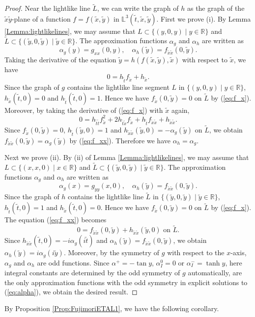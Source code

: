 \documentclass[12pt,amstex]{amsart}%
\theoremstyle{plain} %
\theoremstyle{definition}
\begin{document}
\begin{proof}
Near the lightlike line $\tilde{L}$, we can write the graph of $h$ as the graph of the $\tilde{x}\tilde{y}$-plane of a function $f=f(\tilde{x},\tilde{y})$ in $\mathbb{L}^3(\tilde{t},\tilde{x},\tilde{y})$. First we prove (i). By Lemma \ref{Lemma:lightlikelines}, we may assume that $L\subset \{(y,0,y)\mid y\in \mathbb{R}\}$ and  $\tilde{L} \subset \{(\tilde{y},0,\tilde{y})\mid \tilde{y}\in \mathbb{R}\}$. The approximation functions $\alpha_g$ and $\alpha_h$ are written as
\[
\alpha_g(y)=g_{xx}(0,y),\quad \alpha_h(\tilde{y})=f_{\tilde{x}\tilde{x}}(0,\tilde{y}).
\]
Taking the derivative of the equation $\tilde{y}=h(f(\tilde{x},\tilde{y}),\tilde{x})$ with respect to $\tilde{x}$, we have
\begin{equation}\label{eq:f_x}
0=h_{\tilde{t}}f_{\tilde{x}}+h_{\tilde{x}}.
\end{equation}
Since the graph of $g$ contains the lightlike line segment $L$ in $\{(y,0,y)\mid y\in \mathbb{R}\}$, $h_{\tilde{x}}(\tilde{t},0)=0$ and $h_{\tilde{t}}(\tilde{t},0)=1$. Hence we have $f_{\tilde{x}}(0,\tilde{y})=0$ on $\tilde{L}$ by (\ref{eq:f_x}). Moreover, by taking the derivative of (\ref{eq:f_x}) with $\tilde{x}$ again,
\begin{equation}\label{eq:f_xx}
0=h_{\tilde{t}\tilde{t}}f_{\tilde{x}}^2+2h_{\tilde{t}\tilde{x}}f_{\tilde{x}}+h_{\tilde{t}}f_{\tilde{x}\tilde{x}}+h_{\tilde{x}\tilde{x}}.
\end{equation}
Since $f_{\tilde{x}}(0,\tilde{y})=0$, $h_{\tilde{t}}(\tilde{y},0)=1$ and $h_{\tilde{x}\tilde{x}}(\tilde{y},0)=-\alpha_g(\tilde{y})$ on $\tilde{L}$, we obtain $f_{\tilde{x}\tilde{x}}(0,\tilde{y})=\alpha_g(\tilde{y})$ by (\ref{eq:f_xx}). Therefore we have $\alpha_h=\alpha_g$. 

Next we prove (ii). By (ii) of Lemma \ref{Lemma:lightlikelines}, we may assume that $L\subset \{(x,x,0)\mid x\in \mathbb{R}\}$ and  $\tilde{L} \subset \{(\tilde{y},0,\tilde{y})\mid \tilde{y}\in \mathbb{R}\}$. The approximation functions $\alpha_g$ and $\alpha_h$ are written as
\[
\alpha_g(x)=g_{yy}(x,0),\quad \alpha_h(\tilde{y})=f_{\tilde{x}\tilde{x}}(0,\tilde{y}).
\]
Since the graph of $h$ contains the lightlike line $\tilde{L}$ in $\{(\tilde{y},0,\tilde{y})\mid \tilde{y}\in \mathbb{R}\}$, $h_{\tilde{t}}(\tilde{t},0)=1$ and $h_{\tilde{x}}(\tilde{t},0)=0$. Hence we have $f_{\tilde{x}}(0,\tilde{y})=0$ on $\tilde{L}$ by (\ref{eq:f_x}). The equation (\ref{eq:f_xx}) becomes
\[
0=f_{\tilde{x}\tilde{x}}(0,\tilde{y})+h_{\tilde{x}\tilde{x}}(\tilde{y},0) \text{ on $\tilde{L}$.}
\]
Since $h_{\tilde{x}\tilde{x}}(\tilde{t},0)=-i\alpha_g(i\tilde{t})$ and $\alpha_h(\tilde{y})=f_{\tilde{x}\tilde{x}}(0,\tilde{y})$, we obtain $\alpha_h(\tilde{y})=i\alpha_g(i\tilde{y})$. Moreover, by the symmetry of $g$ with respect to the $x$-axis, $\alpha_g$ and $\alpha_h$ are odd functions. Since $\alpha^+=-\tan{y}$, $\alpha^0_{I}=0$ or $\alpha^-_{I}=\tanh{y}$, here integral constants are determined by the odd symmetry of $g$ automatically, are the only approximation functions with the odd symmetry in explicit solutions to (\ref{eq:alpha}), we obtain the desired result.
\end{proof}
 By Proposition \ref{Prop:FujimoriETAL1}, we have the following corollary.
 
\end{document}
